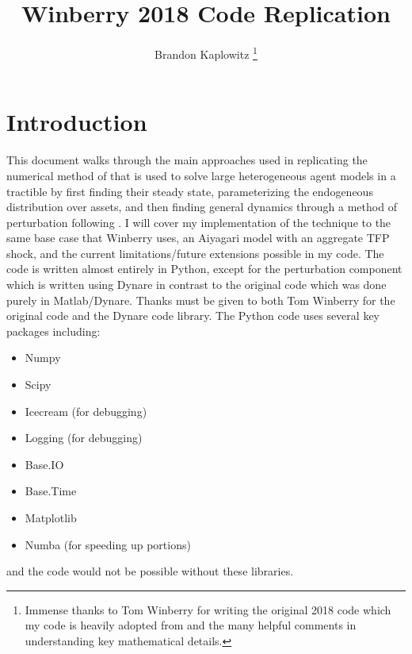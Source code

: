 \documentclass[11pt]{article}
\title{Winberry 2018 Code Replication}
\author{Brandon Kaplowitz \thanks{Immense thanks to Tom Winberry for writing the original 2018 code which my code is heavily adopted from and the many helpful comments in understanding key mathematical details.}}
\begin{document}
\maketitle
\section{Introduction}
This document walks through the main approaches used in replicating the numerical method of \cite{Winberry2018} that is used to solve large heterogeneous agent models in a tractible by first finding their steady state, parameterizing the endogeneous distribution over assets, and then finding general dynamics through a method of perturbation following \cite{Schmitt-Grohe2004}.  I will cover my implementation of the technique to the same base case that Winberry uses, an Aiyagari model with an aggregate TFP shock, and the current limitations/future extensions possible in my code. The code is written almost entirely in Python, except for the perturbation component which is written using Dynare in contrast to the original code which was done purely in Matlab/Dynare. Thanks must be given to both Tom Winberry for the original code and the Dynare code library. The Python code uses several key packages including:
\begin{itemize}
\item Numpy 
\item Scipy
\item Icecream (for debugging)
\item Logging (for debugging)
\item Base.IO
\item Base.Time
\item Matplotlib
\item Numba (for speeding up portions)	
\end{itemize}
and the code would not be possible without these libraries.
\end{document}
